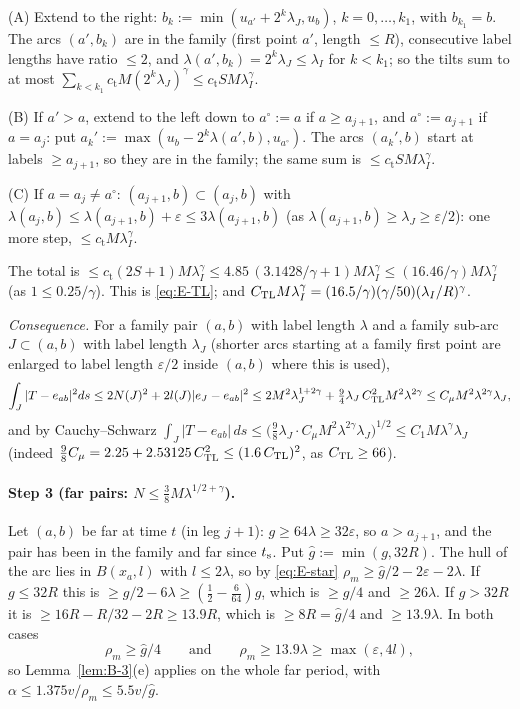 (A) Extend to the right: $b_k:=\min(u_{a'}+2^k\lambda_J,u_b)$, $k=0,\dots,k_1$, with $b_{k_1}=b$. The arcs $(a',b_k)$ are in the
family (first point $a'$, length $\le R$), consecutive label lengths have ratio $\le2$, and
$\lambda(a',b_k)=2^k\lambda_J\le\lambda_I$ for $k<k_1$; so the tilts sum to at most
$\sum_{k<k_1}c_{\mathrm t}M(2^k\lambda_J)^\gamma\le c_{\mathrm t}SM\lambda_I^\gamma$.

(B) If $a'>a$, extend to the left down to $a^\circ:=a$ if $a\ge a_{j+1}$, and $a^\circ:=a_{j+1}$ if $a=a_j$: put
$a_k':=\max(u_b-2^k\lambda(a',b),u_{a^\circ})$. The arcs $(a_k',b)$ start at labels $\ge a_{j+1}$, so they are in the family; the
same sum is $\le c_{\mathrm t}SM\lambda_I^\gamma$.

(C) If $a=a_j\ne a^\circ$: $(a_{j+1},b)\subset(a_j,b)$ with
$\lambda(a_j,b)\le\lambda(a_{j+1},b)+\varepsilon\le3\lambda(a_{j+1},b)$ (as $\lambda(a_{j+1},b)\ge\lambda_J\ge\varepsilon/2$): one
more step, $\le c_{\mathrm t}M\lambda_I^\gamma$.

The total is $\le c_{\mathrm t}(2S+1)M\lambda_I^\gamma\le4.85\,(3.1428/\gamma+1)M\lambda_I^\gamma\le(16.46/\gamma)M\lambda_I^\gamma$
(as $1\le0.25/\gamma$). This is \eqref{eq:E-TL}; and $C_{\mathrm{TL}} M\lambda_I^\gamma=(16.5/\gamma)(\gamma/50)(\lambda_I/R)^\gamma$.

\emph{Consequence.} For a family pair $(a,b)$ with label length $\lambda$ and a family sub-arc $J\subset(a,b)$ with label length
$\lambda_J$ (shorter arcs starting at a family first point are enlarged to label length $\varepsilon/2$ inside $(a,b)$ where this is
used),
\begin{equation}\label{eq:E-mu}
\int_J|T-e_{ab}|^2ds\le2N(J)^2+2l(J)|e_J-e_{ab}|^2\le2M^2\lambda_J^{1+2\gamma}+\tfrac94\lambda_J\,C_{\mathrm{TL}}^2M^2\lambda^{2\gamma}
\le C_\mu M^2\lambda^{2\gamma}\lambda_J,
\end{equation}
and by Cauchy--Schwarz
$\int_J|T-e_{ab}|\,ds\le\bigl(\tfrac98\lambda_J\cdot C_\mu M^2\lambda^{2\gamma}\lambda_J\bigr)^{1/2}\le C_1M\lambda^\gamma\lambda_J$
(indeed $\frac98C_\mu=2.25+2.53125\,C_{\mathrm{TL}}^2\le(1.6\,C_{\mathrm{TL}})^2$, as $C_{\mathrm{TL}}\ge66$).

\paragraph{Step 3 (far pairs: $N\le\frac38M\lambda^{1/2+\gamma}$).}
Let $(a,b)$ be far at time $t$ (in leg $j+1$): $g\ge64\lambda\ge32\varepsilon$, so $a>a_{j+1}$, and the pair has been in the family
and far since $t_{\mathrm s}$. Put $\hat g:=\min(g,32R)$. The hull of the arc lies in $B(x_a,l)$ with $l\le2\lambda$, so by
\eqref{eq:E-star} $\rho_m\ge\hat g/2-2\varepsilon-2\lambda$. If $g\le32R$ this is $\ge g/2-6\lambda\ge(\frac12-\frac6{64})g$, which
is $\ge g/4$ and $\ge26\lambda$. If $g>32R$ it is $\ge16R-R/32-2R\ge13.9R$, which is $\ge8R=\hat g/4$ and $\ge13.9\lambda$. In both
cases
\[
\rho_m\ge\hat g/4\qquad\text{and}\qquad\rho_m\ge13.9\lambda\ge\max(\varepsilon,4l),
\]
so Lemma~\ref{lem:B-3}(e) applies on the whole far period, with $\alpha\le1.375v/\rho_m\le5.5v/\hat g$.

